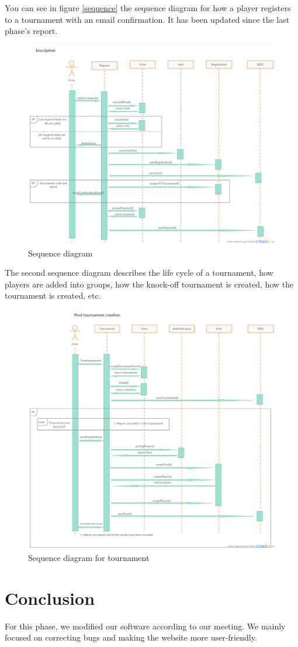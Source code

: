 \documentclass[a4paper, 12pt]{article}
\begin{document}
You can see in figure \ref{sequence} the sequence diagram for how a player registers to a tournament with an email confirmation. It has been updated since the last phase's report.

\begin{figure}[position]
   \caption{\label{playerseq} Sequence diagram}
  \includegraphics[scale=0.4]{Inscription.png}
\end{figure}
The second sequence diagram describes the life cycle of a tournament, how players are added into groups, how the knock-off tournament is created, how the tournament is created, etc. 

\begin{figure}[position]
   \caption{\label{tournseq} Sequence diagram for tournament}
  \includegraphics[scale=0.4]{Tournament.png}
\end{figure}


\section{Conclusion}

For this phase, we modified our software according to our meeting. We mainly focused on correcting bugs and making the website more user-friendly.
\end{document}
